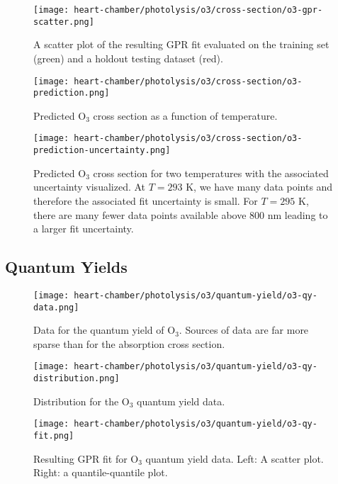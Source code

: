 \begin{figure}[h]
  \centering
  \texttt{[image: heart-chamber/photolysis/o3/cross-section/o3-gpr-scatter.png]}
  \caption{A scatter plot of the resulting GPR fit evaluated on the training set (green) and a holdout testing dataset (red).}
  \label{fig:cs-o3-scatter}
\end{figure}

\begin{figure}[h]
  \centering
  \texttt{[image: heart-chamber/photolysis/o3/cross-section/o3-prediction.png]}
  \caption{Predicted $\mathrm{O_3}$ cross section as a function of temperature.}
  \label{fig:cs-o3-pred}
\end{figure}

\begin{figure}[h]
  \centering
  \texttt{[image: heart-chamber/photolysis/o3/cross-section/o3-prediction-uncertainty.png]}
  \caption{Predicted $\mathrm{O_3}$ cross section for two temperatures with the associated uncertainty visualized. At $T=293$ K, we have many data points and therefore the associated fit uncertainty is small. For $T=295$ K, there are many fewer data points available above $800$ nm leading to a larger fit uncertainty.}
  \label{fig:cs-o3-fit-unc}
\end{figure}


\subsection{Quantum Yields}

\begin{figure}[h]
  \centering
  \texttt{[image: heart-chamber/photolysis/o3/quantum-yield/o3-qy-data.png]}
  \caption{Data for the quantum yield of $\mathrm{O_3}$. Sources of data are far more sparse than for the absorption cross section.}
  \label{fig:qy-o3-data}
\end{figure}

\begin{figure}[h]
  \centering
  \texttt{[image: heart-chamber/photolysis/o3/quantum-yield/o3-qy-distribution.png]}
  \caption{Distribution for the $\mathrm{O_3}$ quantum yield data.}
  \label{fig:qy-o3-dist}
\end{figure}

\begin{figure}[h]
  \centering
  \texttt{[image: heart-chamber/photolysis/o3/quantum-yield/o3-qy-fit.png]}
  \caption{Resulting GPR fit for $\mathrm{O_3}$ quantum yield data. Left: A scatter plot. Right: a quantile-quantile plot.}
  \label{fig:qy-o3-fit}
\end{figure}

